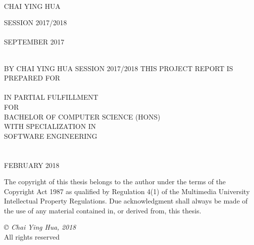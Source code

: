\documentclass[12pt, oneside]{Thesis}
\begin{document}
\begin{titlepage}
\begin{center}

{\LARGE \ttitle}\\[0.4cm] 
\vfill
\Large{CHAI YING HUA} 

\vfill
\normalsize{SESSION 2017/2018}
\vfill
\normalsize\FACNAME\\
\normalsize \UNIVNAME\\
{\normalsize SEPTEMBER 2017}\\ 
\vfill
\end{center}

\end{titlepage}
\thispagestyle{empty}
\begin{center}

	{\LARGE \ttitle}\\[0.4cm] %
	\vfill
	\footnotesize{BY}
	\vfill
	\Large{CHAI YING HUA} %
	\vfill
	\footnotesize{SESSION 2017/2018}
	\vfill
	\footnotesize{THIS PROJECT REPORT IS PREPARED FOR}
	\vfil
	\normalsize\FACNAME\\
	\normalsize \UNIVNAME\\
	\normalsize{IN PARTIAL FULFILLMENT}\\
	\normalsize{FOR}\\
	\vfil
	\normalsize{BACHELOR OF COMPUTER SCIENCE (HONS)}\\
	\normalsize{WITH SPECIALIZATION IN}\\
	\normalsize{SOFTWARE ENGINEERING}\\
	\vfil
	\normalsize\FACNAME\\
	\vfil
	\Large \UNIVNAME\\
	\vfil
	{\normalsize FEBRUARY 2018}\\ %
	\vfill
\end{center}

\newpage
\thispagestyle{empty}

The copyright of this thesis belongs to the author under the terms of the Copyright Act 1987 as qualified by Regulation 4(1) of the Multimedia University Intellectual Property Regulations. Due acknowledgment shall always be made of the use of any material contained in, or derived from, this thesis. 

\vfil
\textit{© Chai Ying Hua, 2018}\\
All rights reserved
\end{document}
